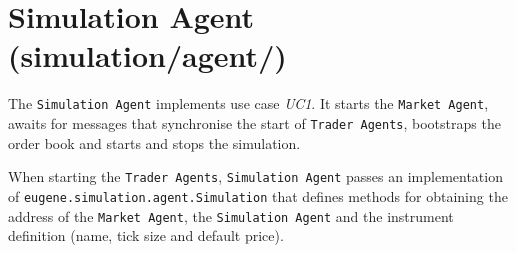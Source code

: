 \section{Simulation Agent (simulation/agent/)}
The \texttt{Simulation Agent} implements use case \textit{UC1}. It starts the \texttt{Market Agent}, awaits for messages that synchronise the start of \texttt{Trader Agents}, bootstraps the order book and starts and stops the simulation. 

When starting the \texttt{Trader Agents}, \texttt{Simulation Agent} passes an implementation of \texttt{eugene.simulation.agent.Simulation} that defines methods for obtaining the address of the \texttt{Market Agent}, the \texttt{Simulation Agent} and the instrument definition (name, tick size and default price).